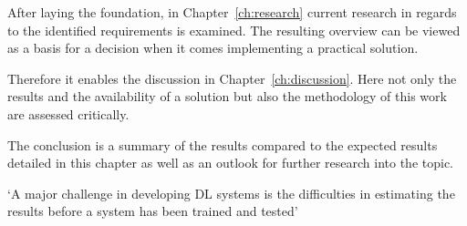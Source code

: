 After laying the foundation, in Chapter~\ref{ch:research} current research in regards to the
identified requirements is examined.
The resulting overview can be viewed as a basis for a decision when it comes implementing a practical
solution.

Therefore it enables the discussion in Chapter~\ref{ch:discussion}.
Here not only the results and the availability of a solution but also the methodology of this work
are assessed critically.

The conclusion is a summary of the results compared to the expected results detailed in this chapter
as well as an outlook for further research into the topic.


`A major challenge in developing DL systems is the difficulties in estimating the results before a system has been trained and tested'\cite{arpteg_software_2018}
